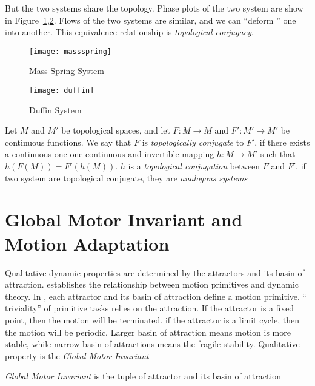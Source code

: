 But the two systems share the topology. 
Phase plots of the two system are show in Figure~\ref{fig:msphaseplot},\ref{fig:duffin}.
Flows of the two systems are similar, and we can ``deform '' one into another.
This equivalence relationship is  \emph{topological conjugacy}.

\begin{figure}
\begin{center}
\texttt{[image: massspring]}
\end{center}
\caption{Mass Spring System}
\label{fig:msphaseplot}
\end{figure}

\begin{figure}
\begin{center}
\texttt{[image: duffin]}
\end{center}
\caption{Duffin System}
\label{fig:duffin}
\end{figure}



\begin{mydef}
Let $M$ and $M'$ be topological spaces, and let $F\colon M\to M$ and $F'\colon M'\to M'$
be continuous functions. We say that $F$ is
\emph{topologically conjugate} to $F'$, if there exists a continuous
one-one continuous and invertible mapping $h \colon M\to M'$ such that $h(F(M))=F'(h(M))$.
$h$ is a \emph{topological conjugation} between $F$ and $F'$.
if two system are topological conjugate, they are \emph{analogous systems}
\end{mydef}




\section{Global Motor Invariant and Motion Adaptation}
\label{sec:GMIandMA}
Qualitative  dynamic properties are determined by the attractors and its basin of attraction.
\moit establishes the relationship between motion primitives and dynamic theory.
In \moit, each attractor and its basin of attraction define a motion primitive.
 `` triviality'' of primitive tasks relies on the attraction.
If the attractor is a fixed point, then the motion will be terminated.
if the attractor is a limit cycle, then the motion will be periodic.
Larger basin of attraction means motion is more stable, while narrow basin of attractions means the fragile stability.
Qualitative property is the \emph{Global Motor Invariant}

\begin{mydef}
\emph{Global Motor Invariant} is the tuple of attractor and its basin of attraction
\end{mydef}


